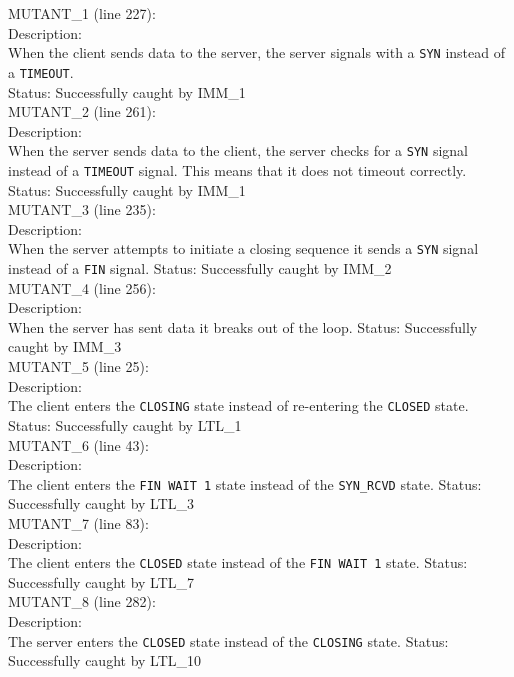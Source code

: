 \documentclass{WigReport} \usepackage{epsfig} %
\begin{document}
MUTANT\_1 (line 227):\\
Description:\\
When the client sends data to the server, the server signals with a \verb|SYN| instead of a \verb|TIMEOUT|.\\
Status: Successfully caught by IMM\_1
\\

MUTANT\_2 (line 261):\\
Description:\\
When the server sends data to the client, the server checks for a \verb|SYN| signal instead of a \verb|TIMEOUT| signal. This means that it does not timeout correctly.
Status: Successfully caught by IMM\_1
\\

MUTANT\_3 (line 235):\\
Description:\\
When the server attempts to initiate a closing sequence it sends a \verb|SYN| signal instead of a \verb|FIN| signal.
Status: Successfully caught by IMM\_2
\\

MUTANT\_4 (line 256):\\
Description:\\
When the server has sent data it breaks out of the loop.
Status: Successfully caught by IMM\_3
\\

MUTANT\_5 (line 25):\\
Description:\\
The client enters the \verb|CLOSING| state instead of re-entering the \verb|CLOSED| state.
Status: Successfully caught by LTL\_1
\\

MUTANT\_6 (line 43):\\
Description:\\
The client enters the \verb|FIN WAIT 1| state instead of the \verb|SYN_RCVD| state.
Status: Successfully caught by LTL\_3
\\

MUTANT\_7 (line 83):\\
Description:\\
The client enters the \verb|CLOSED| state instead of the \verb|FIN WAIT 1| state.
Status: Successfully caught by LTL\_7
\\

MUTANT\_8 (line 282):\\
Description:\\
The server enters the \verb|CLOSED| state instead of the \verb|CLOSING| state.
Status: Successfully caught by LTL\_10
\\
\end{document}
